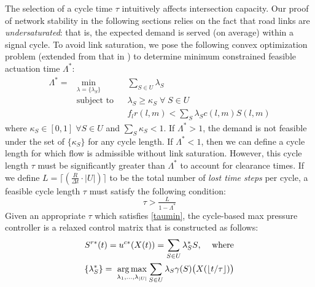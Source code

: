 The selection of a cycle time $\tau$ intuitively affects intersection capacity. Our proof of network stability in the following sections relies on the fact that road links are \emph{undersaturated}: that is, the expected demand is served (on average) within a signal cycle. To avoid link saturation, 
we pose the following convex optimization problem (extended from that in \cite{Allsop1972}) to determine minimum constrained feasible actuation time $\Lambda^*$:
\begin{equation} \label{sum_lambda}
\begin{aligned}
\Lambda ^{*} = & \min_{\lambda = \{\lambda_S\}}
& & \sum_{S\in U} \lambda_{S} \\
& \text{subject to}
& &  \lambda_{S} \geq \kappa_S \; \forall \; S\in U\\
&&& f_{l}r(l,m) < \sum_{S}\lambda_{S} c(l,m)S(l,m)
\end{aligned}
\end{equation}
where $\kappa_S \in [0,1] \; \forall S\in U$ and $\sum_S \kappa_S <1$. If $\Lambda^* > 1$, the demand is not feasible under the set of $\{\kappa_S\}$ for any cycle length. If $\Lambda^* < 1$, then we can define a cycle length for which flow is admissible without link saturation. However, this cycle length $\tau$ must be significantly greater than $\Lambda^*$ to account for clearance times. If we define $L = \lceil (\frac{R}{\Delta t} \cdot |U|) \rceil$ to be the total number of \emph{lost time steps} per cycle, a feasible cycle length $\tau$ must satisfy the following condition: 
\begin{equation} \label{taumin} \tau > \tfrac{L}{1-\Lambda^*} \end{equation} 
Given an appropriate $\tau$ which satisfies \eqref{taumin}, the cycle-based max pressure controller is a relaxed control matrix that is constructed as follows:
\begin{gather} \label{uc*} 
S^{r*}(t) = u^{c*} (X(t)) = \sum_{S \in U}\lambda_{S}^{*}S \text{, \quad where} \\
  \label{distMP_LP}
\{ \lambda^*_S \} = \;  \underset{\lambda_{1},...,\lambda_{\vert U\vert}}{ \arg \max} \sum_{S \in U}\lambda_{S}\gamma(S)\big(X(\lfloor {t}/{\tau} \rfloor)\big)
\end{gather}
